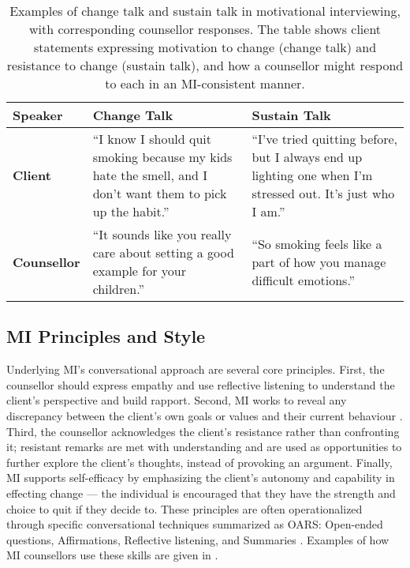 \begin{table}[ht!]
	\centering
	\begin{tabular}{@{} p{} p{} p{} @{}}
		\toprule
		\textbf{Speaker}                                                                                             & \textbf{Change Talk} & \textbf{Sustain Talk} \\
		\midrule
		\textbf{Client}                                                                                              &
		``I know I should quit smoking because my kids hate the smell, and I don’t want them to pick up the habit.'' &
		``I’ve tried quitting before, but I always end up lighting one when I’m stressed out. It’s just who I am.''                                                 \\
		\addlinespace
		\textbf{Counsellor}                                                                                          &
		``It sounds like you really care about setting a good example for your children.''                           &
		``So smoking feels like a part of how you manage difficult emotions.''                                                                                      \\
		\bottomrule
	\end{tabular}
	\caption[Examples of change talk and sustain talk]{Examples of change talk and sustain talk in motivational interviewing, with corresponding counsellor responses. The table shows client statements expressing motivation to change (change talk) and resistance to change (sustain talk), and how a counsellor might respond to each in an MI-consistent manner.}
	\label{tab:change_sustain_talk}
\end{table}

\subsection*{MI Principles and Style}
Underlying MI's conversational approach are several core principles. First, the
counsellor should express empathy and use reflective listening to understand the
client's perspective and build rapport. Second, MI works to reveal any discrepancy
between the client's own goals or values and their current behaviour
\cite{Miller_2023}. Third, the counsellor acknowledges the client's resistance rather
than confronting it; resistant remarks are met with understanding and are used as
opportunities to further explore the client's thoughts, instead of provoking an
argument. Finally, MI supports self-efficacy by emphasizing the client's autonomy and
capability in effecting change --- the individual is encouraged that they have the
strength and choice to quit if they decide to. These principles are often
operationalized through specific conversational techniques summarized as OARS:
Open-ended questions, Affirmations, Reflective listening, and Summaries
\cite{Rollnick1995}. Examples of how MI counsellors use these skills are given in
.

